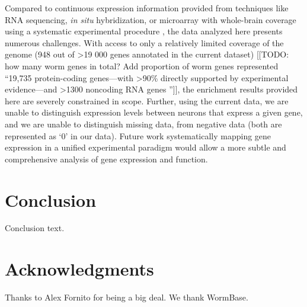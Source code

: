 \documentclass[10pt,letterpaper]{article}
\begin{document}
Compared to continuous expression information provided from techniques like RNA sequencing, \emph{in situ} hybridization, or microarray with whole-brain coverage using a systematic experimental procedure \cite{Lein:2007jn, Shen:2012ua, Tasic:2016jp}, the data analyzed here presents numerous challenges.
With access to only a relatively limited coverage of the genome (948 out of >19 000 genes \cite{Hillier2005} annotated in the current dataset) [[TODO: how many worm genes in total? Add proportion of worm genes represented ``19,735 protein-coding genes—with >90\% directly supported by experimental evidence—and >1300 noncoding RNA genes \cite{Hillier2005}'']], the enrichment results provided here are severely constrained in scope.
Further, using the current data, we are unable to distinguish expression levels between neurons that express a given gene, and we are unable to distinguish missing data, from negative data (both are represented as `0' in our data).
Future work systematically mapping gene expression in a unified experimental paradigm would allow a more subtle and comprehensive analysis of gene expression and function.


\section*{Conclusion}

Conclusion text.

\section*{Acknowledgments}
Thanks to Alex Fornito for being a big deal.
We thank WormBase.

\nolinenumbers

%
%
%



\end{document}

